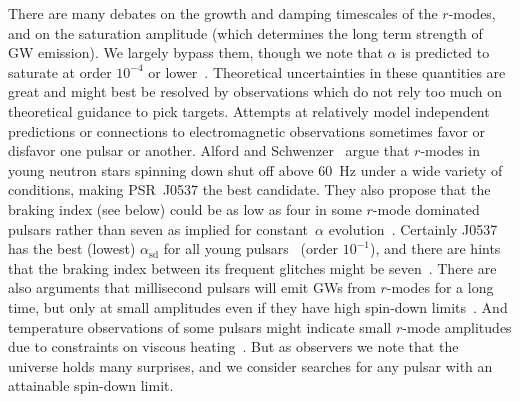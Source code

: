 \documentclass{ttuthes2007}
\begin{document}
There are many debates on the growth and damping timescales of the $r$-modes,
and on the saturation amplitude (which determines the long term strength of
\ac{GW} emission).
We largely bypass them, though we note that $\alpha$ is predicted to saturate
at order $10^{-4}$ or lower~\cite{Arras:2002dw}.
Theoretical uncertainties in these quantities are great and might best be
resolved by observations which do not rely too much on theoretical guidance to
pick targets.
Attempts at relatively model independent predictions or connections to
electromagnetic observations sometimes favor or disfavor one pulsar or
another.
Alford and Schwenzer~\cite{Alford:2012yn} argue that $r$-modes in young
neutron stars spinning down shut off above 60~Hz under a wide variety of
conditions, making PSR~J0537 the best candidate.
They also propose that the braking index (see below) could be as low as four
in some $r$-mode dominated pulsars rather than seven as implied for
constant~$\alpha$ evolution~\cite{Owen:1998xg}.
Certainly J0537 has the best (lowest)
$\alpha_\mathrm{sd}$ for all young pulsars~\cite{Owen_2010} (order
$10^{-1}$), and there are hints that the braking index between its frequent
glitches might be seven~\cite{Andersson:2017fow}.
There are also arguments that millisecond pulsars will emit \acp{GW} from
$r$-modes for a long time, but only at small amplitudes even if they have high
spin-down limits~\cite{Bondarescu:2013xwa, Alford:2014pxa}.
And temperature observations of some pulsars might indicate small $r$-mode
amplitudes due to constraints on viscous heating~\cite{Schwenzer:2016tkf}.
But as observers we note that the universe holds many surprises, and we
consider searches for any pulsar with an attainable spin-down limit.
\end{document}
